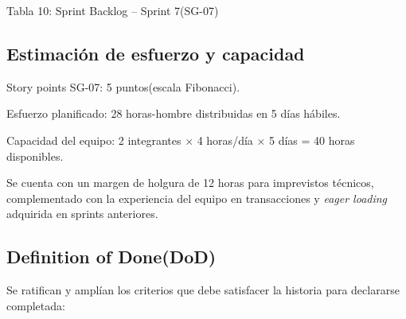 \documentclass[12pt,a4paper]{article}
\begin{document}
\begin{center}
\small Tabla 10: Sprint Backlog -- Sprint 7(SG-07)
\end{center}

\subsection*{Estimación de esfuerzo y capacidad}

Story points SG-07: 5 puntos(escala Fibonacci).

Esfuerzo planificado: 28 horas-hombre distribuidas en 5 días hábiles.

Capacidad del equipo: 2 integrantes × 4 horas/día × 5 días = 40 horas disponibles.

Se cuenta con un margen de holgura de 12 horas para imprevistos técnicos, complementado con la experiencia del equipo en transacciones y \textit{eager loading} adquirida en sprints anteriores.

\subsection*{Definition of Done(DoD)}

Se ratifican y amplían los criterios que debe satisfacer la historia para declararse completada:
\end{document}
